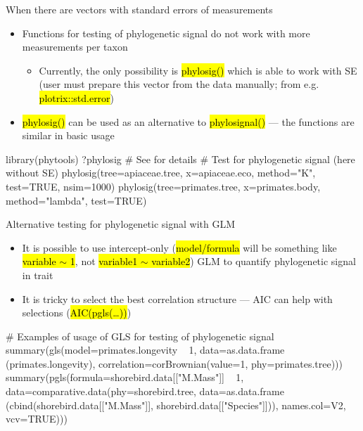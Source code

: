 \documentclass[compress, ucs, xelatex, 11pt, xcolor=svgnames,
  hyperref={
    bookmarks=true,
    unicode=true,
    colorlinks=true,
    pdftitle={Molecular data in R},
    plainpages=false,
    pdfauthor={Vojtech Zeisek},
    pdfsubject={Course about phylogeny and evolution in R},
    pdfcreator={XeLaTeX},
    pdfkeywords={R, evolution, phylogeny, molecular data},
    linkcolor=Tomato,
    anchorcolor=SaddleBrown,
    citecolor=Goldenrod,
    filecolor=DarkMagenta,
    menucolor=Sienna,
    urlcolor=DarkTurquoise,
    pdftex},
  url={hyphens, lowtilde} %
  ]{beamer}
\renewcommand{\texttt}[1]{\hl{\ttfamily #1}}
\begin{document}
\begin{frame}[fragile]{When there are vectors with standard errors of measurements}
  \begin{itemize}
    \item Functions for testing of phylogenetic signal do not work with more measurements per taxon
    \begin{itemize}
      \item Currently, the only possibility is \texttt{phylosig()} which is able to work with SE (user must prepare this vector from the data manually; from e.g. \texttt{plotrix::std.error})
    \end{itemize}
    \item \texttt{phylosig()} can be used as an alternative to \texttt{phylosignal()} --- the functions are similar in basic usage
  \end{itemize}
  \begin{spluscode}
    library(phytools)
    ?phylosig # See for details
    # Test for phylogenetic signal (here without SE)
    phylosig(tree=apiaceae.tree, x=apiaceae.eco, method="K", test=TRUE,
      nsim=1000)
    phylosig(tree=primates.tree, x=primates.body, method="lambda",
      test=TRUE)
  \end{spluscode}
\end{frame}

\begin{frame}[fragile]{Alternative testing for phylogenetic signal with GLM}
  \begin{itemize}
    \item It is possible to use intercept-only (\texttt{model/formula} will be something like \texttt{variable $\sim$ 1}, not \texttt{variable1 $\sim$ variable2}) GLM to quantify phylogenetic signal in trait
    \item It is tricky to select the best correlation structure --- AIC can help with selections (\texttt{AIC(pgls(\ldots))})
  \end{itemize}
  \begin{spluscode}
    # Examples of usage of GLS for testing of phylogenetic signal
    summary(gls(model=primates.longevity ~ 1, data=as.data.frame
      (primates.longevity), correlation=corBrownian(value=1,
      phy=primates.tree)))
    summary(pgls(formula=shorebird.data[["M.Mass"]] ~ 1,
      data=comparative.data(phy=shorebird.tree, data=as.data.frame
      (cbind(shorebird.data[["M.Mass"]], shorebird.data[["Species"]])),
      names.col=V2, vcv=TRUE)))
  \end{spluscode}
\end{frame}
\end{document}
